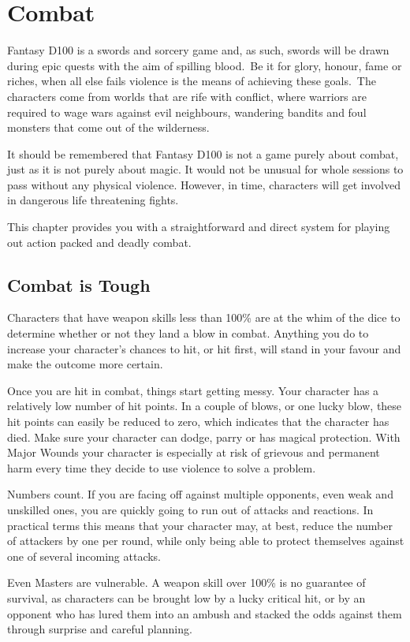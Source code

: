 \chapter{Combat}
\label{ch:combat}

Fantasy D100 is a swords and sorcery game and, as such, swords will be drawn during epic quests with the aim of spilling blood. Be it for glory, honour, fame or riches, when all else fails violence is the means of achieving these goals. The characters come from worlds that are rife with conflict, where warriors are required to wage wars against evil neighbours, wandering bandits and foul monsters that come out of the wilderness.  

It should be remembered that Fantasy D100 is not a game purely about combat, just as it is not purely about magic. It would not be unusual for whole sessions to pass without any physical violence. However, in time, characters will get involved in dangerous life threatening fights. 

This chapter provides you with a straightforward and direct system for playing out action packed and deadly combat.

\section{Combat is Tough}
Characters that have weapon skills less than 100\% are at the whim of the dice to determine whether or not they land a blow in combat. Anything you do to increase your character’s chances to hit, or hit first, will stand in your favour and make the outcome more certain.

Once you are hit in combat, things start getting messy. Your character has a relatively low number of hit points. In a couple of blows, or one lucky blow, these hit points can easily be reduced to zero, which indicates that the character has died. Make sure your character can dodge, parry or has magical protection. With Major Wounds your character is especially at risk of grievous and permanent harm every time they decide to use violence to solve a problem.

Numbers count. If you are facing off against multiple opponents, even weak and unskilled ones, you are quickly going to run out of attacks and reactions. In practical terms this means that your character may, at best, reduce the number of attackers by one per round, while only being able to protect themselves against one of several incoming attacks. 

Even Masters are vulnerable. A weapon skill over 100\% is no guarantee of survival, as characters can be brought low by a lucky critical hit, or by an opponent who has lured them into an ambush and stacked the odds against them through surprise and careful planning. 

